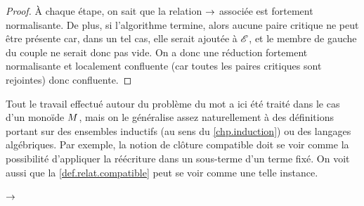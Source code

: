 \begin{proof}
  \`A chaque étape, on sait que la relation $\mathrel{\to}$ associée est
  fortement normalisante. De plus, si l'algorithme termine, alors
  aucune paire critique ne peut être présente car, dans un tel cas,
  elle serait ajoutée à $\mathscr{E}$, et le membre de gauche du couple
  ne serait donc pas vide. On a donc une réduction fortement
  normalisante et localement confluente (car toutes les paires
  critiques sont rejointes) donc confluente.
\end{proof}

\begin{remark}
  Tout le travail effectué autour du problème du mot a ici été
  traité dans le cas d'un monoïde $M$, mais on le
  généralise assez naturellement à des définitions portant sur des
  ensembles inductifs (au sens du \cref{chp.induction})
  ou des langages algébriques. Par exemple, la notion de
  clôture compatible doit se voir comme la possibilité
  d'appliquer la réécriture dans un sous-terme d'un
  terme fixé. On voit aussi que la \cref{def.relat.compatible}
  peut se voir comme une telle instance.
\end{remark}

\begin{algorithm}[t]
  
  \KwRet $\mathrel{\to}$\;
  \caption{Algorithme de complétion de Knuth-Bendix}
  \label{algo.KnuthBendix}
\end{algorithm}


